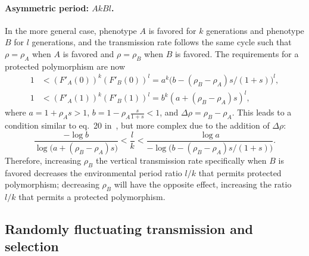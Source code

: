 \documentclass[12pt]{extarticle} %
\begin{document}
\paragraph{Asymmetric period: $AkBl$.}
In the more general case, phenotype $A$ is favored for $k$ generations and phenotype $B$ for $l$ generations, and the transmission rate follows the same cycle such that $\rho=\rho_A$ when $A$ is favored and $\rho=\rho_B$ when $B$ is favored.
The requirements for a protected polymorphism are now
\begin{equation}\begin{aligned}
1 &< (F'_A(0))^k (F'_B(0))^l = a^k \big(b - (\rho_B - \rho_A) s/(1+s)\big)^l,\\
1 &< (F'_A(1))^k (F'_B(1))^l = b^k (a + (\rho_B - \rho_A) s)^l,
\end{aligned}\end{equation}
where $a=1+\rho_A s>1$, $b=1-\rho_A\frac{s}{1+s}<1$, and $\Delta \rho = \rho_B - \rho_A$.
This leads to a condition similar to eq.~20 in~\citet{Ram2018}, but more complex due to the addition of $\Delta \rho$:
\begin{equation} \label{eq:poly_condition_periodic_fluc_k_l}
\frac{-\log{b}}{\log{\big(a+(\rho_B - \rho_A) s\big)}} < 
\frac{l}{k} < 
\frac{\log{a}}{-\log{\big(b-(\rho_B - \rho_A) s/(1+s)\big)}}.
\end{equation}
Therefore, increasing $\rho_B$ the vertical transmission rate specifically when $B$ is favored decreases the environmental period ratio $l/k$ that permits protected polymorphism; decreasing $\rho_B$ will have the opposite effect, increasing the ratio $l/k$ that permits a protected polymorphism.


\subsection*{Randomly fluctuating transmission and selection}
\end{document}
